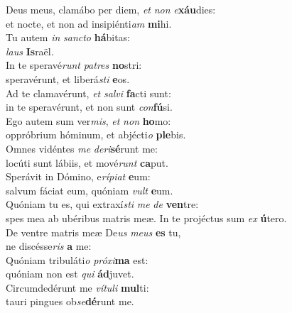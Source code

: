 \evenverse Deus meus, clamábo per diem, \textit{et} \textit{non} \textit{e}\textbf{xáu}dies:~\*\\
\evenverse et nocte, et non ad insipiénti\textit{am} \textbf{mi}hi.\\
\oddverse Tu autem \textit{in} \textit{san}\textit{cto} \textbf{há}bitas:~\*\\
\oddverse \textit{laus} \textbf{Is}raël.\\
\evenverse In te speravé\textit{runt} \textit{pa}\textit{tres} \textbf{no}stri:~\*\\
\evenverse speravérunt, et liberá\textit{sti} \textbf{e}os.\\
\oddverse Ad te clamavérunt, \textit{et} \textit{sal}\textit{vi} \textbf{fa}cti sunt:~\*\\
\oddverse in te speravérunt, et non sunt \textit{con}\textbf{fú}si.\\
\evenverse Ego autem sum ver\textit{mis}, \textit{et} \textit{non} \textbf{ho}mo:~\*\\
\evenverse oppróbrium hóminum, et abjécti\textit{o} \textbf{ple}bis.\\
\oddverse Omnes vidéntes \textit{me} \textit{de}\textit{ri}\textbf{sé}runt me:~\*\\
\oddverse locúti sunt lábiis, et mové\textit{runt} \textbf{ca}put.\\
\evenverse Sperávit in Dómino, e\textit{rí}\textit{pi}\textit{at} \textbf{e}um:~\*\\
\evenverse salvum fáciat eum, quóniam \textit{vult} \textbf{e}um.\\
\oddverse Quóniam tu es, qui extraxí\textit{sti} \textit{me} \textit{de} \textbf{ven}tre:~\*\\
\oddverse spes mea ab ubéribus matris meæ. In te projéctus sum \textit{ex} \textbf{ú}tero.\\
\evenverse De ventre matris meæ De\textit{us} \textit{me}\textit{us} \textbf{es} tu,~\*\\
\evenverse ne discésse\textit{ris} \textbf{a} me:\\
\oddverse Quóniam tribuláti\textit{o} \textit{pró}\textit{xi}\textbf{ma} est:~\*\\
\oddverse quóniam non est \textit{qui} \textbf{ád}juvet.\\
\evenverse Circumdedérunt me \textit{ví}\textit{tu}\textit{li} \textbf{mul}ti:~\*\\
\evenverse tauri pingues ob\textit{se}\textbf{dé}runt me.\\
